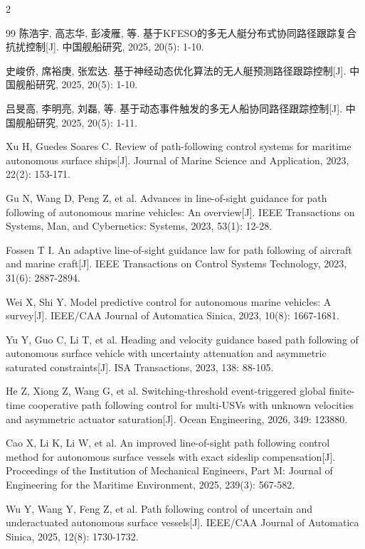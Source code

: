 \documentclass[authordraft]{ctacn}
\begin{document}
\begin{multicols}{2}
\begin{thebibliography}{99}
陈浩宇, 高志华, 彭凌雁, 等. 基于KFESO的多无人艇分布式协同路径跟踪复合抗扰控制[J]. 中国舰船研究, 2025, 20(5): 1-10.

史峻侨, 席裕庚, 张宏达. 基于神经动态优化算法的无人艇预测路径跟踪控制[J]. 中国舰船研究, 2025, 20(5): 1-10.

吕旻高, 李明亮, 刘磊, 等. 基于动态事件触发的多无人船协同路径跟踪控制[J]. 中国舰船研究, 2025, 20(5): 1-11.

Xu H, Guedes Soares C. Review of path-following control systems for maritime autonomous surface ships[J]. Journal of Marine Science and Application, 2023, 22(2): 153-171.

Gu N, Wang D, Peng Z, et al. Advances in line-of-sight guidance for path following of autonomous marine vehicles: An overview[J]. IEEE Transactions on Systems, Man, and Cybernetics: Systems, 2023, 53(1): 12-28.

Fossen T I. An adaptive line-of-sight guidance law for path following of aircraft and marine craft[J]. IEEE Transactions on Control Systems Technology, 2023, 31(6): 2887-2894.

Wei X, Shi Y. Model predictive control for autonomous marine vehicles: A survey[J]. IEEE/CAA Journal of Automatica Sinica, 2023, 10(8): 1667-1681.

Yu Y, Guo C, Li T, et al. Heading and velocity guidance based path following of autonomous surface vehicle with uncertainty attenuation and asymmetric saturated constraints[J]. ISA Transactions, 2023, 138: 88-105.

He Z, Xiong Z, Wang G, et al. Switching-threshold event-triggered global finite-time cooperative path following control for multi-USVs with unknown velocities and asymmetric actuator saturation[J]. Ocean Engineering, 2026, 349: 123880.

Cao X, Li K, Li W, et al. An improved line-of-sight path following control method for autonomous surface vessels with exact sideslip compensation[J]. Proceedings of the Institution of Mechanical Engineers, Part M: Journal of Engineering for the Maritime Environment, 2025, 239(3): 567-582.

Wu Y, Wang Y, Feng Z, et al. Path following control of uncertain and underactuated autonomous surface vessels[J]. IEEE/CAA Journal of Automatica Sinica, 2025, 12(8): 1730-1732.

\end{thebibliography}\vspace{-20pt}

\end{multicols}
\end{document}
